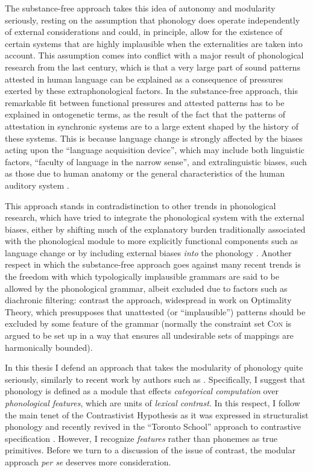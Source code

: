 The substance\hyp free approach takes this idea of autonomy and modularity seriously, resting on the assumption that phonology does operate independently of external considerations and could, in principle, allow for the existence of certain systems that are highly implausible when the externalities are taken into account. This assumption comes into conflict with a major result of phonological research from the last century, which is that a very large part of sound patterns attested in human language can be explained as a consequence of pressures exerted by these extraphonological factors. In the substance\hyp free approach, this remarkable fit between functional pressures and attested patterns has to be explained in ontogenetic terms, \ie as the result of the fact that the patterns of attestation in synchronic systems are to a large extent shaped by the history of these systems. This is because language change is strongly affected by the biases acting upon the \enquote{language acquisition device}, which may include both linguistic factors, \ie {} \enquote{faculty of language in the narrow sense}, and extralinguistic biases, such as those due to human anatomy or the general characteristics of the human auditory system \citep[\egm][]{ohala1981}.

This approach stands in contradistinction to other trends in phonological research, which have tried to integrate the phonological system with the external biases, either by shifting much of the explanatory burden traditionally associated with the phonological module to more explicitly functional components such as language change \citep{blevins,blevins06:_evolut_phonol} or by including external biases \emph{into} the phonology \citep[\egm][]{hayes04:_phonet}. Another respect in which the substance\hyp free approach goes against many recent trends is the freedom with which typologically implausible grammars are said to be allowed by the phonological grammar, albeit excluded due to factors such as diachronic filtering: contrast the approach, widespread in work on Optimality Theory, which presupposes that unattested (or \enquote{implausible}) patterns should be excluded by some feature of the grammar (normally the constraint set \textsc{Con} is argued to be set up in a way that ensures all undesirable sets of mappings are harmonically bounded).

In this thesis I defend an approach that takes the modularity of phonology quite seriously, similarly to recent work by authors such as \citet{reiss07:_modul,scheer10:_guide_morph,bermudez-oterong}. Specifically, I suggest that phonology is defined as a module that effects \emph{categorical computation} over \emph{phonological features}, which are units of \emph{lexical contrast}. In this respect, I follow the main tenet of the Contrastivist Hypothesis as it was expressed in structuralist phonology \citep[\egm][]{Tru39,mart55,hjelmslev75:_resum} and recently revived in the \enquote{Toronto School} approach to contrastive specification \citep[\egm][]{torontoschool,dresher-hier,dresher09,currie07}. However, I recognize \emph{features} rather than phonemes as true primitives. Before we turn to a discussion of the issue of contrast, the modular approach \emph{per se} deserves more consideration.


